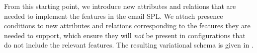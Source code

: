 

From this starting point, we introduce new attributes and relations that are
needed to implement the features in the email SPL. We attach presence
conditions to new attributes and relations corresponding to the features
they are needed to support, which ensure they will \emph{not} be present
in configurations that do not include the relevant features.
%
The resulting variational schema is given in .


